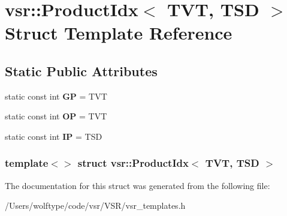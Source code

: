 \hypertarget{structvsr_1_1_product_idx_3_01_t_v_t_00_01_t_s_d_01_4}{\section{vsr\-:\-:Product\-Idx$<$ T\-V\-T, T\-S\-D $>$ Struct Template Reference}
\label{structvsr_1_1_product_idx_3_01_t_v_t_00_01_t_s_d_01_4}
}
\subsection*{Static Public Attributes}
\begin{DoxyCompactItemize}
\item 
\hypertarget{structvsr_1_1_product_idx_3_01_t_v_t_00_01_t_s_d_01_4_a535be999cbbbc0a1c347ec6e3f0cd6e7}{static const int {\bfseries G\-P} = T\-V\-T}\label{structvsr_1_1_product_idx_3_01_t_v_t_00_01_t_s_d_01_4_a535be999cbbbc0a1c347ec6e3f0cd6e7}

\item 
\hypertarget{structvsr_1_1_product_idx_3_01_t_v_t_00_01_t_s_d_01_4_a80394e0a7e5b32b508f96d7d536bd92b}{static const int {\bfseries O\-P} = T\-V\-T}\label{structvsr_1_1_product_idx_3_01_t_v_t_00_01_t_s_d_01_4_a80394e0a7e5b32b508f96d7d536bd92b}

\item 
\hypertarget{structvsr_1_1_product_idx_3_01_t_v_t_00_01_t_s_d_01_4_ae2e65ebc4fa917e86574c1fcf2f52f2f}{static const int {\bfseries I\-P} = T\-S\-D}\label{structvsr_1_1_product_idx_3_01_t_v_t_00_01_t_s_d_01_4_ae2e65ebc4fa917e86574c1fcf2f52f2f}

\end{DoxyCompactItemize}
\subsubsection*{template$<$$>$ struct vsr\-::\-Product\-Idx$<$ T\-V\-T, T\-S\-D $>$}



The documentation for this struct was generated from the following file\-:\begin{DoxyCompactItemize}
\item 
/\-Users/wolftype/code/vsr/\-V\-S\-R/vsr\-\_\-templates.\-h\end{DoxyCompactItemize}
